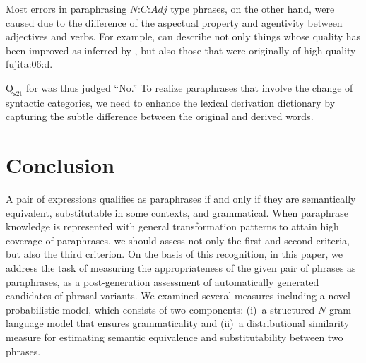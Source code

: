 \documentclass[english]{jnlp_1.4}
\renewcommand{\cite}{}
\begin{document}
Most errors in paraphrasing $N$:$C$:$Adj$ type phrases, on the other
hand, were caused due to the difference of the aspectual property and
agentivity between adjectives and verbs.
For example,  can describe not only things whose
quality has been improved as inferred by , but also
those that were originally of high quality \cite{fujita:06:d}.
\begin{multicols}{2}
\end{multicols}
{\noindent}$\textrm{Q}_{\textrm{s2t}}$ for  was thus
judged ``No.''  To realize paraphrases that involve the change of
syntactic categories, we need to enhance the lexical derivation
dictionary by capturing the subtle difference between the original and
derived words.



\section{Conclusion}
\label{sec:conclusion}

A pair of expressions qualifies as paraphrases if and only if they are
semantically equivalent, substitutable in some contexts, and
grammatical.  When paraphrase knowledge is represented with general
transformation patterns to attain high coverage of paraphrases, we
should assess not only the first and second criteria, but also the
third criterion.
On the basis of this recognition, in this paper, we address the task
of measuring the appropriateness of the given pair of phrases as
paraphrases, as a post-generation assessment of automatically
generated candidates of phrasal variants.  We examined several
measures including a novel probabilistic model, which consists of two
components: (i)~a structured $N$-gram language model that ensures
grammaticality and (ii)~a distributional similarity measure for
estimating semantic equivalence and substitutability between two
phrases.
\end{document}
